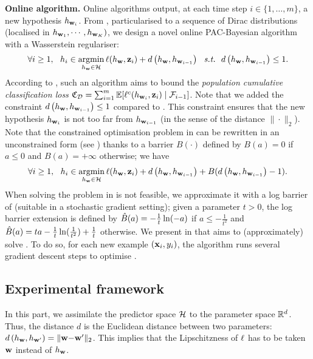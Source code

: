 \textbf{Online algorithm.} Online algorithms output, at each time step $i \in \{1, \dots, m\}$, a new hypothesis $h_{\mathbf{w}_i}$. 
From , particularised to a sequence of Dirac distributions (localised in $h_{\mathbf{w}_1},\cdots,h_{\mathbf{w}_K})$, we design a novel online PAC-Bayesian algorithm with a Wasserstein regulariser:
\begin{align}
    \label{eq:online-alg-exp}
    \forall i \geq 1,\ \ h_i\in \argmin_{h_{\wbf}\in \Hcal} \loss(h_{\wbf}, \z_i) +d\LP h_{\wbf},h_{\wbf_{i-1}}\RP \ \ \text{\emph{s.t.}} \ \ d\LP h_{\wbf},h_{\wbf_{i-1}}\RP \le 1.
\end{align}
According to , such an algorithm aims to bound the {\it population cumulative classification loss} $\mathfrak{C}_{\mathcal{D}} = \sum_{i=1}^{m}\operatorname*{\mathbb{E}}[\ell^{c}(h_{\mathbf{w}_i},\mathbf{z}_i) \mid \mathcal{F}_{i-1}]$.
Note that we added the constraint $d\left( h_{\mathbf{w}},h_{\mathbf{w}_{i-1}}\right) \le 1$ compared to . 
This constraint ensures that the new hypothesis $h_{\mathbf{w}_i}$ is not too far from $h_{\mathbf{w}_{i-1}}$ (in the sense of the distance $\|\cdot\|_2$).
Note that the constrained optimisation problem in  can be rewritten in an unconstrained form (see \cite{boyd2004convex}) thanks to a barrier $B(\cdot)$ defined by $B(a)=0$ if $a\le 0$ and $B(a)=+\infty$ otherwise; we have 
\begin{align} 
    \label{eq:online-alg-exp-2}
    \forall i \geq 1,\ \ h_i\in \operatorname*{\mathrm{argmin}}_{h_{\mathbf{w}}\in \mathcal{H}} \ell(h_{\mathbf{w}}, \mathbf{z}_i) + d\left( h_{\mathbf{w}},h_{\mathbf{w}_{i-1}}\right)+ B(d\left( h_{\mathbf{w}},h_{\mathbf{w}_{i-1}}\right)-1).
\end{align}
When solving the problem in  is not feasible, we approximate it with a log barrier of \cite{kervadec2022constrained} (suitable in a stochastic gradient setting); given a parameter $t>0$, the log barrier extension is defined by $\hat{B}(a) = -\frac{1}{t}\ln(-a)$ if $a\le -\frac{1}{t^2}$ and $\hat{B}(a) = ta-\frac{1}{t}\ln(\frac{1}{t^2})+\frac{1}{t}$ otherwise.
We present in   that aims to (approximately) solve .
To do so, for each new example $(\mathbf{x}_i, y_i)$, the algorithm runs several gradient descent steps to optimise .


\subsection{Experimental framework}
\label{sec:exp-fram}

In this part, we assimilate the predictor space $\mathcal{H}$ to the parameter space $\mathbb{R}^d$.
Thus, the distance $d$ is the Euclidean distance between two parameters: $d\left( h_{\mathbf{w}},h_{\mathbf{w}'}\right) = \|\mathbf{w}{-}\mathbf{w}'\|_2$.
This implies that the Lipschitzness of $\ell$ has to be taken \wrt $\mathbf{w}$ instead of $h_{\mathbf{w}}$.

